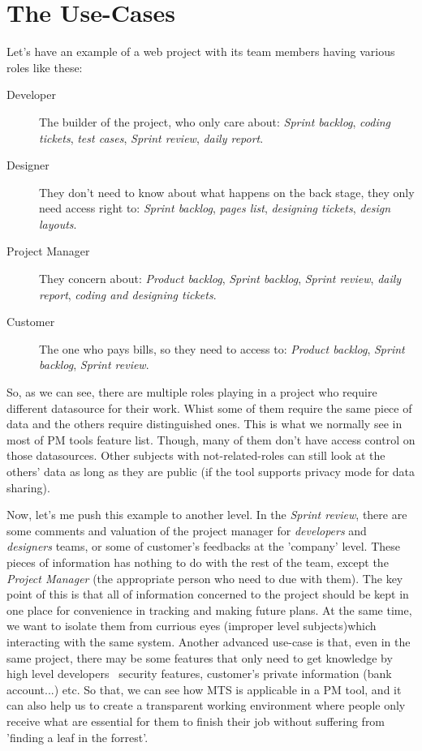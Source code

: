 
\section{The Use-Cases}
\label{ch:introduction:use_cases}
Let's have an example of a web project with its team members having various roles like these:
\begin{description}
\item[Developer] The builder of the project, who only care about: \emph{Sprint backlog}, \emph{coding tickets}, \emph{test cases}, \emph{Sprint review}, \emph{daily report}.
\item[Designer] They don't need to know about what happens on the back stage, they only need access right to: \emph{Sprint backlog}, \emph{pages list}, \emph{designing tickets}, \emph{design layouts}.
\item[Project Manager] They concern about: \emph{Product backlog}, \emph{Sprint backlog}, \emph{Sprint review}, \emph{daily report}, \emph{coding and designing tickets}.
\item[Customer] The one who pays bills, so they need to access to: \emph{Product backlog}, \emph{Sprint backlog}, \emph{Sprint review}.
\end{description}

So, as we can see, there are multiple roles playing in a project who require different datasource for their work.
Whist some of them require the same piece of data and the others require distinguished ones.
This is what we normally see in most of PM tools feature list.
Though, many of them don't have access control on those datasources.
Other subjects with not-related-roles can still look at the others' data as long as they are public (if the tool supports privacy mode for data sharing).

Now, let's me push this example to another level. In the \emph{Sprint review}, there are some comments and valuation of the project manager for \emph{developers} and \emph{designers} teams, or some of customer's feedbacks at the 'company' level.
These pieces of information has nothing to do with the rest of the team, except the \emph{Project Manager} (\ie the appropriate person who need to due with them).
The key point of this is that all of information concerned to the project should be kept in one place for convenience in tracking and making future plans.
At the same time, we want to isolate them from currious eyes (\ie improper level subjects)which interacting with the same system.
Another advanced use-case is that, even in the same project, there may be some features that only need to get knowledge by high level developers \eg\, security features, customer's private information (bank account...) etc.
So that, we can see how MTS is applicable in a PM tool, and it can also help us to create a transparent working environment where people only receive what are essential for them to finish their job without suffering from 'finding a leaf in the forrest'.

